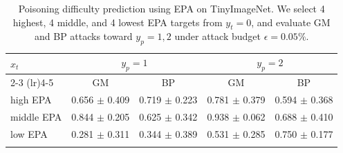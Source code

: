 \begin{table}[t]
\centering
\begin{tabular}{lcccc}
\toprule
$x_t$ & \multicolumn{2}{c}{$y_p=1$} & \multicolumn{2}{c}{$y_p=2$} \\
\cmidrule(lr){2-3} \cmidrule(lr){4-5}
 & GM & BP & GM & BP \\
\midrule
high EPA & 0.656 $\pm$ 0.409 & 0.719 $\pm$ 0.223 & 0.781 $\pm$ 0.379 & 0.594 $\pm$ 0.368 \\
middle EPA & 0.844 $\pm$ 0.205 & 0.625 $\pm$ 0.342 & 0.938 $\pm$ 0.062 & 0.688 $\pm$ 0.410 \\
low EPA & 0.281 $\pm$ 0.311 & 0.344 $\pm$ 0.389 & 0.531 $\pm$ 0.285 & 0.750 $\pm$ 0.177 \\
\bottomrule
\caption{Poisoning difficulty prediction using EPA on TinyImageNet. We select 4 highest, 4 middle, and 4 lowest EPA targets from $y_t=0$, and evaluate GM and BP attacks toward $y_p=1,2$ under attack budget $\epsilon=0.05\%$.}
\label{tab:tiny_epa_full}
\end{tabular}
\end{table}
